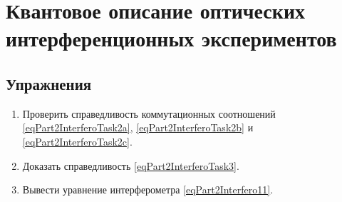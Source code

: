 \chapter{Квантовое описание оптических интерференционных экспериментов}
\label{chInterfero}





\section{Упражнения}
\begin{enumerate}
\item Проверить справедливость коммутационных соотношений
  \eqref{eqPart2InterferoTask2a}, \eqref{eqPart2InterferoTask2b} и
  \eqref{eqPart2InterferoTask2c}. 
\item Доказать справедливость \eqref{eqPart2InterferoTask3}.
\item Вывести уравнение интерферометра \eqref{eqPart2Interfero11}.
\end{enumerate}

